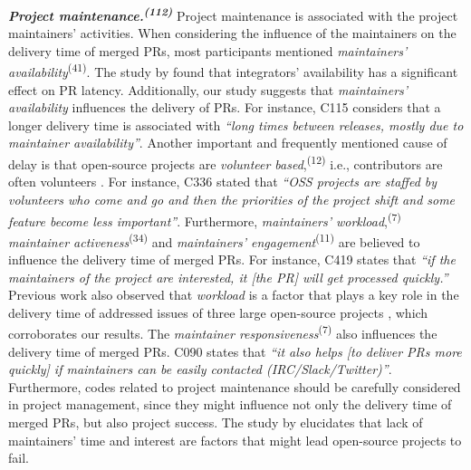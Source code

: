 \vspace{0.6mm}
\noindent\textit{\textbf{Project maintenance.\textsuperscript{(112)}}} Project maintenance is associated with the project maintainers' activities. When considering the influence of the maintainers on the delivery time of merged PRs, most participants mentioned \textit{maintainers' availability}\textsuperscript{(41)}.
The study by \cite{Yu2016-cy} found that integrators' availability has a significant effect on PR latency. Additionally, our study suggests that \textit{maintainers' availability} influences the delivery of PRs. For instance, C115 considers that a longer delivery time is associated with \textit{``long times between releases, mostly due to maintainer availability''}.
Another important and frequently mentioned cause of delay is that open-source projects are \textit{volunteer based},\textsuperscript{(12)} i.e., contributors are often volunteers \citep{alexander2002working}. For instance, C336 stated that \textit{``OSS projects are staffed by volunteers who come and go and then the priorities of the project shift and some feature become less important''}. 
Furthermore, \textit{maintainers' workload},\textsuperscript{(7)} \textit{maintainer activeness}\textsuperscript{(34)} and \textit{maintainers' engagement}\textsuperscript{(11)} are believed to influence the delivery time of merged PRs. For instance, C419 states that \textit{``if the maintainers of the project are interested, it [the PR] will get processed quickly.''} Previous work also observed that \textit{workload} is a factor that plays a key role in the delivery time of addressed issues of three large open-source projects \citep{daCosta2018impact}, which corroborates our results. The \textit{maintainer responsiveness}\textsuperscript{(7)} also influences the delivery time of merged PRs. C090 states that \textit{``it also helps [to deliver PRs more quickly] if maintainers can be easily contacted (IRC/Slack/Twitter)''}. Furthermore, codes related to project maintenance should be carefully considered in project management, since they might influence not only the delivery time of merged PRs, but also project success. The study by \cite{coelho2017modern} elucidates that lack of maintainers' time and interest are factors that might lead open-source projects to fail. 

